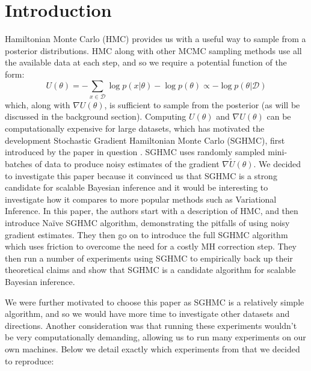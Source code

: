 
\section{Introduction}

Hamiltonian Monte Carlo (HMC) provides us with a useful way to sample from a posterior distributions. HMC along with other MCMC sampling methods use all the available data at each step, and so we require a potential function of the form:
\begin{equation*}
    U(\theta) = - \sum_{x\in\mathcal{D}}\log p(x| \theta) - \log p(\theta ) \propto -\log p(\theta | \mathcal{D})
\end{equation*}
which, along with $\nabla U(\theta)$, is sufficient to sample from the posterior (as will be discussed in the background section). Computing $U(\theta)$ and $\nabla U(\theta)$ can be computationally expensive for large datasets, which has motivated the development Stochastic Gradient Hamiltonian Monte Carlo (SGHMC), first introduced by the paper in question \cite{sghmc}. SGHMC uses randomly sampled mini-batches of data to produce noisy estimates of the gradient $\nabla \widetilde U(\theta)$. We decided to investigate this paper because it convinced us that SGHMC is a strong candidate for scalable Bayesian inference and it would be interesting to investigate how it compares to more popular methods such as Variational Inference. In this paper, the authors start with a description of HMC, and then introduce Naïve SGHMC algorithm, demonstrating the pitfalls of using noisy gradient estimates. They then go on to introduce the full SGHMC algorithm which uses friction to overcome the need for a costly MH correction step. They then run a number of experiments using SGHMC to empirically back up their theoretical claims and show that SGHMC is a candidate algorithm for scalable Bayesian inference.

We were further motivated to choose this paper as SGHMC is a relatively simple algorithm, and so we would have more time to investigate other datasets and directions.  Another consideration was that running these experiments wouldn't be very computationally demanding, allowing us to run many experiments on our own machines. Below we detail exactly which experiments from \cite{sghmc} that we decided to reproduce:

